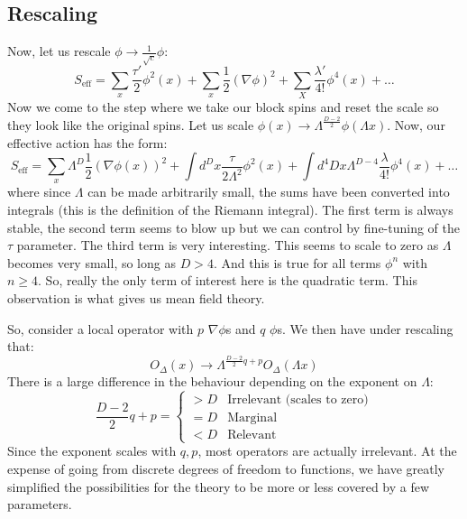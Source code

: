 \subsection{Rescaling}
Now, let us rescale $\phi \to \frac{1}{\sqrt{c}}\phi$:
\begin{equation}
    S_{\text{eff}} = \sum_x \frac{\tau'}{2}\phi^2(x) + \sum_x \frac{1}{2}(\nabla \phi)^2 + \sum_X \frac{\lambda'}{4!}\phi^4(x) + \ldots 
\end{equation}
Now we come to the step where we take our block spins and reset the scale so they look like the original spins. Let us scale $\phi(x) \to \Lambda^{\frac{D-2}{2}}\phi(\Lambda x)$. Now, our effective action has the form:
\begin{equation}
    S_{\text{eff}} = \sum_x \Lambda^D \frac{1}{2}(\nabla\phi(x))^2 + \int d^D x \frac{\tau}{2\Lambda^2}\phi^2(x) + \int d^4Dx \Lambda^{D-4}\frac{\lambda}{4!}\phi^4(x) + \ldots 
\end{equation}
where since $\Lambda$ can be made arbitrarily small, the sums have been converted into integrals (this is the definition of the Riemann integral). The first term is always stable, the second term seems to blow up but we can control by fine-tuning of the $\tau$ parameter. The third term is very interesting. This seems to scale to zero as $\Lambda$ becomes very small, so long as $D > 4$. And this is true for all terms $\phi^n$ with $n \geq 4$. So, really the only term of interest here is the quadratic term. This observation is what gives us mean field theory.

So, consider a local operator with $p$ $\nabla \phi$s and $q$ $\phi$s. We then have under rescaling that:
\begin{equation}
    O_\Delta(x) \to \Lambda^{\frac{D-2}{2}q + p}O_\Delta(\Lambda x)
\end{equation}
There is a large difference in the behaviour depending on the exponent on $\Lambda$:
\begin{equation}
    \frac{D-2}{2}q + p = \begin{cases}
        > D & \text{Irrelevant (scales to zero)}
        \\ = D & \text{Marginal}
        \\ < D & \text{Relevant}
    \end{cases}
\end{equation}
Since the exponent scales with $q, p$, most operators are actually irrelevant. At the expense of going from discrete degrees of freedom to functions, we have greatly simplified the possibilities for the theory to be more or less covered by a few parameters.